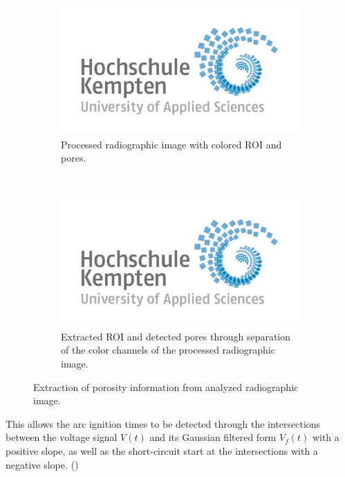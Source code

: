     
    
        
        
    
        

    
\begin{figure}[!htbp]
    \begin{subfigure}[b]{\textwidth}
        \includegraphics[width=\textwidth]{Figures/logo-thk.jpg}
        \caption{Processed radiographic image with colored ROI and pores.}
    \end{subfigure}\\
    \begin{subfigure}[b]{\textwidth}
        \includegraphics[width=\textwidth]{Figures/logo-thk.jpg}
        \caption{Extracted ROI and detected pores through separation of the color channels of the processed radiographic image.}
    \end{subfigure}
    \caption{Extraction of porosity information from analyzed radiographic image.}
    \label{fig:pore_extraction}
\end{figure}



    This allows the arc ignition times to be detected through the intersections between the voltage signal \(V(t)\) and its Gaussian filtered form \(V_f(t)\) with a positive slope, as well as the short-circuit start at the intersections with a negative slope. ()%

